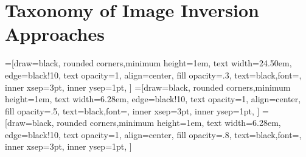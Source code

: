 \section{Taxonomy of Image Inversion Approaches} \label{sec:method}

=[draw=black,
    rounded corners,minimum height=1em,
    text width=24.50em, edge=black!10, 
    text opacity=1, align=center,
    fill opacity=.3,  text=black,font=\scriptsize,
    inner xsep=3pt, inner ysep=1pt,
    ]
=[draw=black,
    rounded corners,minimum height=1em,
    text width=6.28em, edge=black!10, 
    text opacity=1, align=center,
    fill opacity=.5,  text=black,font=\scriptsize,
    inner xsep=3pt, inner ysep=1pt,
    ]
=[draw=black, 
    rounded corners,minimum height=1em,
    text width=6.28em, edge=black!10, 
    text opacity=1, align=center,
    fill opacity=.8,  text=black,font=\scriptsize,
    inner xsep=3pt, inner ysep=1pt,
    ]

